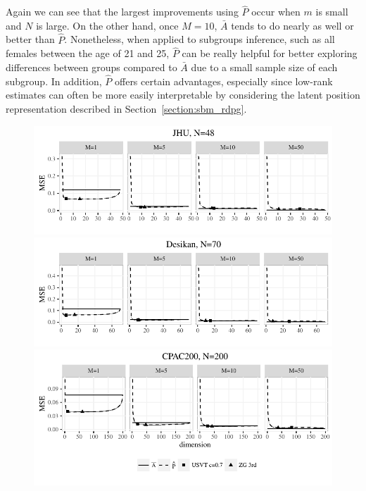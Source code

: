 \documentclass[10pt,letterpaper]{article}
\renewcommand{\hat}{\widehat}
\begin{document}
Again we can see that the largest improvements using $\hat{P}$ occur when $m$ is small and $N$ is large. 
On the other hand, once $M=10$, $\bar{A}$ tends to do nearly as well or better than $\hat{P}$. 
Nonetheless, when applied to subgroups inference, such as all females between the age of 21 and 25, $\hat{P}$ can be really helpful for better exploring differences between groups compared to $\bar{A}$ due to a small sample size of each subgroup.
In addition, $\hat{P}$ offers certain advantages, especially since low-rank estimates can often be more easily interpretable by considering the latent position representation described in Section~\ref{section:sbm_rdpg}.

\begin{figure}[!htbp]
\centering
\includegraphics[width=1\textwidth]{corr_data_MSE_jhu.pdf}\\
\includegraphics[width=1\textwidth]{corr_data_MSE_desikan.pdf}\\
\includegraphics[width=1\textwidth]{corr_data_MSE_CPAC200.pdf}

\end{figure}
\end{document}
